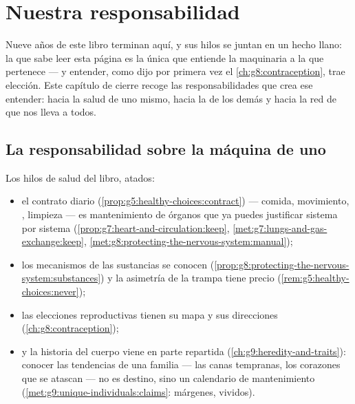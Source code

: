 \chapter{Nuestra responsabilidad}\label{ch:g9:our-responsibility}

Nueve años de este libro terminan aquí, y sus hilos se juntan en un
hecho llano: la  que sabe leer esta página es la única 
que entiende la maquinaria a la que pertenece --- y entender, como dijo
por primera vez el \cref{ch:g8:contraception}, trae elección. Este
capítulo de cierre recoge las responsabilidades que crea ese entender:
hacia la salud de uno mismo, hacia la de los demás y hacia la red de
 que nos lleva a todos.

\section{La responsabilidad sobre la máquina de uno}

\begin{proposition}\label{prop:g9:our-responsibility:self}
Los hilos de salud del libro, atados:
\begin{itemize}
  \item el contrato diario
        (\cref{prop:g5:healthy-choices:contract}) --- comida,
        movimiento, , limpieza --- es mantenimiento de órganos que
        ya puedes justificar sistema por sistema
        (\cref{prop:g7:heart-and-circulation:keep},
        \cref{met:g7:lungs-and-gas-exchange:keep},
        \cref{met:g8:protecting-the-nervous-system:manual});
  \item los mecanismos de las sustancias se conocen
        (\cref{prop:g8:protecting-the-nervous-system:substances}) y la
        asimetría de la trampa tiene precio
        (\cref{rem:g5:healthy-choices:never});
  \item las elecciones reproductivas tienen su mapa y sus direcciones
        (\cref{ch:g8:contraception});
  \item y la historia del cuerpo viene en parte repartida
        (\cref{ch:g9:heredity-and-traits}): conocer las tendencias de
        una familia --- las canas tempranas, los corazones que se
        atascan --- no es destino, sino un calendario de mantenimiento
        (\cref{met:g9:unique-individuals:claims}: márgenes, vividos).
\end{itemize}
\end{proposition}
\admitted

